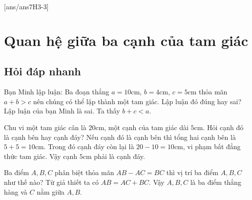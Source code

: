 [ans/ans7H3-3]
\section{Quan hệ giữa ba cạnh của tam giác}
\subsection{Hỏi đáp nhanh}
\begin{ex}%
Bạn Minh lập luận: Ba đoạn thẳng $a=10$cm, $b=4$cm, $c=5$cm thỏa mãn $a+b>c$ nên chúng có thể lập thành một tam giác. Lập luận đó đúng hay sai?
\loigiai
{
Lập luận của bạn Minh là sai. Ta thấy $b+c<a$.
}
\end{ex}
\begin{ex}%
Chu vi một tam giác cân là $20$cm, một cạnh của tam giác dài $5$cm. Hỏi cạnh đó là cạnh bên hay cạnh đáy?
\loigiai
{
Nếu cạnh đó là cạnh bên thì tổng hai cạnh bên là $5+5=10$cm. Trong đó cạnh đáy còn lại là $20-10=10$cm, vi phạm bất đẳng thức tam giác. Vậy cạnh $5$cm phải là cạnh đáy.
}
\end{ex}
\begin{ex}%
Ba điểm $A,B, C$ phân biệt thỏa mãn $AB-AC=BC$ thì vị trí ba điểm $A,B,C$ như thế nào?
\loigiai
{
	Từ giả thiết ta có  $AB=AC+BC$. Vậy $A,B,C$ là ba điểm thẳng hàng và $C$ nằm giữa $A,B$.
}
\end{ex}
